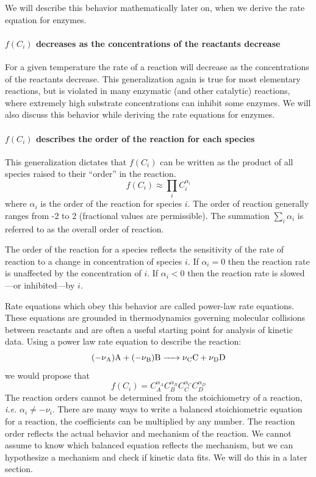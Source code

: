 \documentclass[
]{article}
\begin{document}
We will describe this behavior mathematically later on, when we derive the rate equation for enzymes.

\hypertarget{fc_i-decreases-as-the-concentrations-of-the-reactants-decrease}{%
\paragraph{\texorpdfstring{\(f(C_i)\) decreases as the concentrations of the reactants decrease}{f(C\_i) decreases as the concentrations of the reactants decrease}}\label{fc_i-decreases-as-the-concentrations-of-the-reactants-decrease}}

For a given temperature the rate of a reaction will decrease as the concentrations of the reactants decrease. This generalization again is true for most elementary reactions, but is violated in many enzymatic (and other catalytic) reactions, where extremely high substrate concentrations can inhibit some enzymes. We will also discuss this behavior while deriving the rate equations for enzymes.

\hypertarget{fc_i-describes-the-order-of-the-reaction-for-each-species}{%
\paragraph{\texorpdfstring{\(f(C_i)\) describes the order of the reaction for each species}{f(C\_i) describes the order of the reaction for each species}}\label{fc_i-describes-the-order-of-the-reaction-for-each-species}}

This generalization dictates that \(f(C_i)\) can be written as the product of all species raised to their ``order'' in the reaction.
\[f(C_i) \approx \prod_{i} C_i^{\alpha_i} \]
where \(\alpha_i\) is the order of the reaction for species \(i\). The order of reaction generally ranges from -2 to 2 (fractional values are permissible). The summation \(\sum_i \alpha_i\) is referred to as the overall order of reaction.

The order of the reaction for a species reflects the sensitivity of the rate of reaction to a change in concentration of species \(i\). If \(\alpha_i = 0\) then the reaction rate is unaffected by the concentration of \(i\). If \(\alpha_i < 0\) then the reaction rate is slowed---or inhibited---by \(i\).

Rate equations which obey this behavior are called power-law rate equations. These equations are grounded in thermodynamics governing molecular collisions between reactants and are often a useful starting point for analysis of kinetic data. Using a power law rate equation to describe the reaction:
\[\ce{(-\nu_{A})A + (-\nu_{B})B -> \nu_{C}C + \nu_{D}D}\]
we would propose that
\[f(C_i) = C_A^{\alpha_A}C_B^{\alpha_B}C_C^{\alpha_C}C_D^{\alpha_D}\]
The reaction orders cannot be determined from the stoichiometry of a reaction, \emph{i.e.} \(\alpha_i \ne -\nu_i\). There are many ways to write a balanced stoichiometric equation for a reaction, the coefficients can be multiplied by any number. The reaction order reflects the actual behavior and mechanism of the reaction. We cannot assume to know which balanced equation reflects the mechanism, but we can hypothesize a mechanism and check if kinetic data fits. We will do this in a later section.
\end{document}

